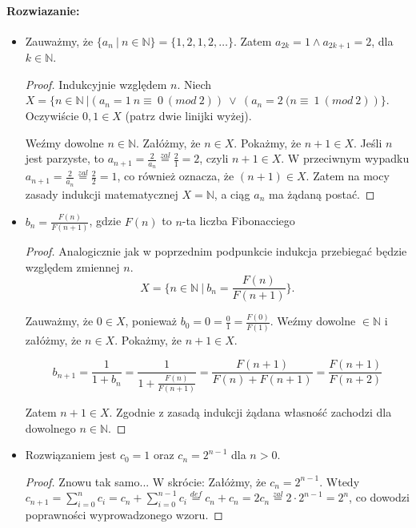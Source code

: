 \documentclass{article}
\newenvironment{rozw}{\paragraph{Rozwiazanie:}}{\hfill}
\begin{document}
\begin{rozw}
\begin{itemize}

\item Zauważmy, że $\lbrace a_n \ | \ n \in \mathbb{N} \rbrace = \lbrace 1, 2, 1, 2, \ldots \rbrace$. Zatem $a_{2k} = 1 \wedge a_{2k+1} = 2$, dla $k \in \mathbb{N}$. 

\begin{proof}
Indukcyjnie względem $n$. Niech $X = \lbrace n \in \mathbb{N} \ | \left( a_n = 1 \ n \equiv \ 0 \ (mod \ 2) \right) \ \vee \ \left( a_n = 2 \ (n \equiv \ 1 \ (mod \ 2) \right) \rbrace$. Oczywiście $0, 1 \in X$ (patrz dwie linijki wyżej).

Weźmy dowolne $n \in \mathbb{N}$. Załóżmy, że $n \in X$. Pokażmy, że $n+1 \in X$. Jeśli $n$ jest parzyste, to $a_{n+1} = \frac{2}{a_n} \stackrel{zal}{=} \frac{2}{1} = 2$, czyli $n+1 \in X$. W przeciwnym wypadku $a_{n+1} = \frac{2}{a_n} \stackrel{zal}{=} \frac{2}{2} = 1$, co również oznacza, że $(n+1) \in X$. Zatem na mocy zasady indukcji matematycznej $X = \mathbb{N}$, a ciąg $a_n$ ma żądaną postać.
\end{proof}

\item $b_n = \frac{F(n)}{F(n+1)}$, gdzie $F(n)$ to $n$-ta liczba Fibonacciego 

\begin{proof}
Analogicznie jak w poprzednim podpunkcie indukcja przebiegać będzie względem zmiennej $n$. $$ X = \lbrace n \in \mathbb{N} \ | \ b_n = \frac{F(n)}{F(n+1)} \rbrace.$$

Zauważmy, że $0 \in X$, ponieważ $b_0 = 0 = \frac{0}{1} = \frac{F(0)}{F(1)}$. Weźmy dowolne $\in \mathbb{N}$ i załóżmy, że $n \in X$. Pokażmy, że $n+1 \in X$.

$$b_{n+1} = \frac{1}{1 + b_n} = \frac{1}{1 + \frac{F(n)}{F(n+1)}} = \frac{F(n+1)}{F(n) + F(n+1)} = \frac{F(n+1)}{F(n+2)}$$

Zatem $n+1 \in X$. Zgodnie z zasadą indukcji żądana własność zachodzi dla dowolnego $n \in \mathbb{N}$.

\end{proof}

\item Rozwiązaniem jest $c_0 = 1$ oraz $c_n = 2^{n-1}$ dla $n > 0$.

\begin{proof}
Znowu tak samo... W skrócie: Załóżmy, że $c_n = 2^{n-1}$. Wtedy $c_{n+1} = \sum_{i=0}^{n} c_i = c_n + \sum_{i=0}^{n-1} c_i \stackrel{def}{=} c_n + c_n = 2 c_n \stackrel{zal}{=} 2 \cdot 2^{n-1} = 2^n$, co dowodzi poprawności wyprowadzonego wzoru.
\end{proof}


\end{itemize}
\end{rozw}
\end{document}
